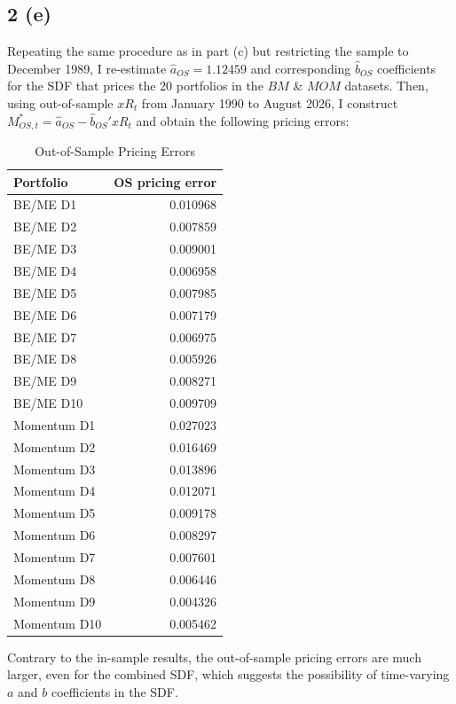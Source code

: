 \documentclass[11pt]{article}
\begin{document}
\subsection*{2 (e)}
Repeating the same procedure as in part (c) but restricting the sample to December 1989, I re-estimate $\hat{a}_{OS}= 1.12459$ 
and corresponding $\hat{b}_{OS}$ coefficients for the SDF that prices the 20 portfolios in the $BM$ \& $MOM$ datasets.
Then, using out-of-sample $xR_t$ from January 1990 to August 2026, I construct $M_{OS,t}^* = \hat{a}_{OS} - \hat{b}_{OS}'xR_t$ and 
obtain the following pricing errors:

\begin{table}[H]
  \centering
  \caption{Out-of-Sample Pricing Errors}
  \label{tab:2e-pricing-errors}
  \begin{tabular}{lr}
    \toprule
    Portfolio & OS pricing error \\
    \midrule
    BE/ME D1 & 0.010968 \\
    BE/ME D2 & 0.007859 \\
    BE/ME D3 & 0.009001 \\
    BE/ME D4 & 0.006958 \\
    BE/ME D5 & 0.007985 \\
    BE/ME D6 & 0.007179 \\
    BE/ME D7 & 0.006975 \\
    BE/ME D8 & 0.005926 \\
    BE/ME D9 & 0.008271 \\
    BE/ME D10 & 0.009709 \\
    Momentum D1 & 0.027023 \\
    Momentum D2 & 0.016469 \\
    Momentum D3 & 0.013896 \\
    Momentum D4 & 0.012071 \\
    Momentum D5 & 0.009178 \\
    Momentum D6 & 0.008297 \\
    Momentum D7 & 0.007601 \\
    Momentum D8 & 0.006446 \\
    Momentum D9 & 0.004326 \\
    Momentum D10 & 0.005462 \\
    \bottomrule
  \end{tabular}
\end{table}

Contrary to the in-sample results, the out-of-sample pricing errors are much larger, even for the
combined SDF, which suggests the possibility of time-varying $a$ and $b$ coefficients in the SDF. 
\end{document}
